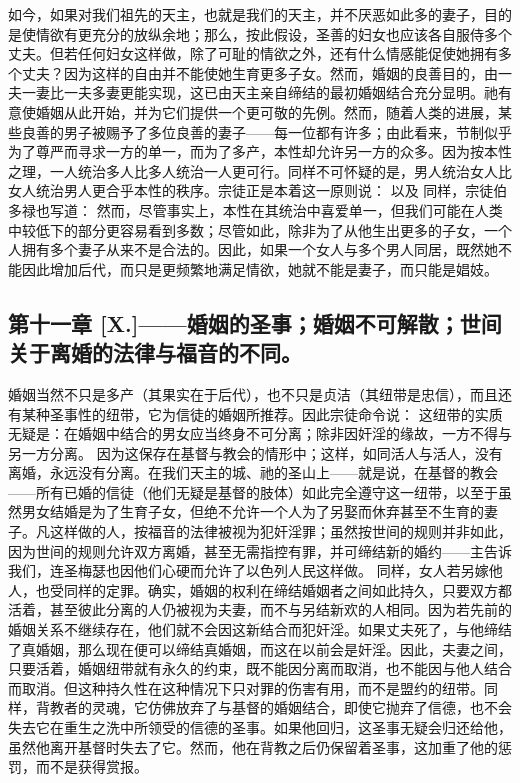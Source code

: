 如今，如果对我们祖先的天主，也就是我们的天主，并不厌恶如此多的妻子，目的是使情欲有更充分的放纵余地；那么，按此假设，圣善的妇女也应该各自服侍多个丈夫。但若任何妇女这样做，除了可耻的情欲之外，还有什么情感能促使她拥有多个丈夫？因为这样的自由并不能使她生育更多子女。然而，婚姻的良善目的，由一夫一妻比一夫多妻更能实现，这已由天主亲自缔结的最初婚姻结合充分显明。祂有意使婚姻从此开始，并为它们提供一个更可敬的先例。然而，随着人类的进展，某些良善的男子被赐予了多位良善的妻子——每一位都有许多；由此看来，节制似乎为了尊严而寻求一方的单一，而为了多产，本性却允许另一方的众多。因为按本性之理，一人统治多人比多人统治一人更可行。同样不可怀疑的是，男人统治女人比女人统治男人更合乎本性的秩序。宗徒正是本着这一原则说： 以及 同样，宗徒伯多禄也写道： 然而，尽管事实上，本性在其统治中喜爱单一，但我们可能在人类中较低下的部分更容易看到多数；尽管如此，除非为了从他生出更多的子女，一个人拥有多个妻子从来不是合法的。因此，如果一个女人与多个男人同居，既然她不能因此增加后代，而只是更频繁地满足情欲，她就不能是妻子，而只能是娼妓。\par


\subsection{第十一章 [X.]——婚姻的圣事；婚姻不可解散；世间关于离婚的法律与福音的不同。}

婚姻当然不只是多产（其果实在于后代），也不只是贞洁（其纽带是忠信），而且还有某种圣事性的纽带，它为信徒的婚姻所推荐。因此宗徒命令说： 这纽带的实质无疑是：在婚姻中结合的男女应当终身不可分离；除非因奸淫的缘故，一方不得与另一方分离。 因为这保存在基督与教会的情形中；这样，如同活人与活人，没有离婚，永远没有分离。在我们天主的城、祂的圣山上——就是说，在基督的教会——所有已婚的信徒（他们无疑是基督的肢体）如此完全遵守这一纽带，以至于虽然男女结婚是为了生育子女，但绝不允许一个人为了另娶而休弃甚至不生育的妻子。凡这样做的人，按福音的法律被视为犯奸淫罪；虽然按世间的规则并非如此，因为世间的规则允许双方离婚，甚至无需指控有罪，并可缔结新的婚约——主告诉我们，连圣梅瑟也因他们心硬而允许了以色列人民这样做。 同样，女人若另嫁他人，也受同样的定罪。确实，婚姻的权利在缔结婚姻者之间如此持久，只要双方都活着，甚至彼此分离的人仍被视为夫妻，而不与另结新欢的人相同。因为若先前的婚姻关系不继续存在，他们就不会因这新结合而犯奸淫。如果丈夫死了，与他缔结了真婚姻，那么现在便可以缔结真婚姻，而这在以前会是奸淫。因此，夫妻之间，只要活着，婚姻纽带就有永久的约束，既不能因分离而取消，也不能因与他人结合而取消。但这种持久性在这种情况下只对罪的伤害有用，而不是盟约的纽带。同样，背教者的灵魂，它仿佛放弃了与基督的婚姻结合，即使它抛弃了信德，也不会失去它在重生之洗中所领受的信德的圣事。如果他回归，这圣事无疑会归还给他，虽然他离开基督时失去了它。然而，他在背教之后仍保留着圣事，这加重了他的惩罚，而不是获得赏报。\par

